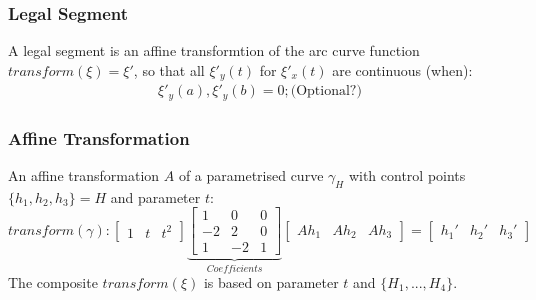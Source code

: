 \documentclass{article}
\begin{document}
\subsubsection{Legal Segment}
A legal segment is an affine transformtion of the arc curve function $transform(\xi) = \xi'$, so that all $\xi'_{y}(t)$ for $\xi'_{x}(t)$ are continuous (when):
\begin{align}
\xi'_{y}(a), \xi'_{y}(b) = 0; \text{(Optional?)}
\end{align}

\subsubsection{Affine Transformation}
An affine transformation $A$ of a parametrised curve $\gamma_{H}$ with control points $\{h_{1},h_{2},h_{3}\} = H$ and parameter $t$:
\begin{equation}
transform(\gamma):
\begin{bmatrix}
1 & t & t^2
\end{bmatrix}
\underbrace{\begin{bmatrix}
1 & 0 & 0\\
-2 & 2 & 0\\
1 & -2 &1
\end{bmatrix}}_{Coefficients}
\begin{bmatrix}
Ah_{1} & Ah_{2} & Ah_{3}
\end{bmatrix}
=
\begin{bmatrix}
h_{1}' & h_{2}' & h_{3}'
\end{bmatrix}
\end{equation}
The composite $transform(\xi)$ is based on parameter $t$ and $\{H_{1}, ... ,H_{4}\}$.
\end{document}
